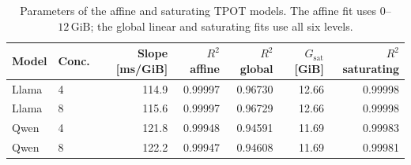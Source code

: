 \begin{table}[t]
    \centering
    \caption{Parameters of the affine and saturating TPOT models. The affine fit uses $0$--$12\,\mathrm{GiB}$; the global linear and saturating fits use all six levels.}
    \label{tab:fit_results}
    \scriptsize
    \setlength{\tabcolsep}{3pt}
    \begin{tabular}{llrrrrr}
        \toprule
        Model & Conc. & Slope [ms/GiB] & $R^2$ affine & $R^2$ global & $G_{\mathrm{sat}}$ [GiB] & $R^2$ saturating \\
        \midrule
        Llama & 4 & 114.9 & 0.99997 & 0.96730 & 12.66 & 0.99998 \\
        Llama & 8 & 115.6 & 0.99997 & 0.96729 & 12.66 & 0.99998 \\
        Qwen & 4 & 121.8 & 0.99948 & 0.94591 & 11.69 & 0.99983 \\
        Qwen & 8 & 122.2 & 0.99947 & 0.94608 & 11.69 & 0.99981 \\
        \bottomrule
    \end{tabular}
\end{table}
